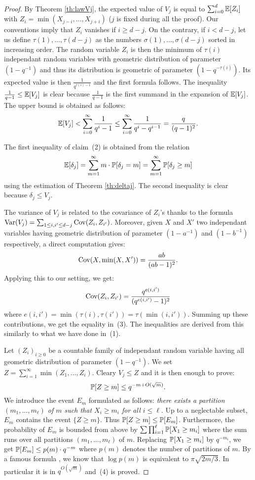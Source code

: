 \documentclass{article}
\begin{document}
\begin{proof}
By Theorem \ref{th:lawVj}, the expected value of $V_j$ is equal to 
$\sum_{i=0}^d \E[Z_i]$ with $Z_i = \min(X_{j-i}, \ldots, X_{j+i})$ ($j$ 
is fixed during all the proof). Our conventions imply that $Z_i$ 
vanishes if $i \geq d-j$. On the contrary, if $i < d-j$, let us define 
$\tau(1), \ldots, \tau(d-j)$ as the numbers $\sigma(1), \ldots, 
\sigma(d-j)$ sorted in increasing order. The random variable $Z_i$ 
is then the minimum of $\tau(i)$ independant random variables with 
geometric distribution of parameter $(1 - q^{-1})$ and thus its 
distribution is geometric of parameter $(1 - q^{-\tau(i)})$.
Its expected value is then $\frac 1 {q^{\tau(i) - 1}}$ and the first
formula follows. The inequality $\frac 1 {q-1} \leq \E[V_j]$ is clear
because $\frac 1 {q-1}$ is the first summand in the expansion of
$\E[V_j]$. The upper bound is obtained as follows:
$$\E[V_j] < \sum_{i=0}^\infty \frac 1{q^i - 1}
\leq \sum_{i=0}^\infty \frac 1{q^i - q^{i-1}} = \frac q {(q-1)^2}.$$

The first inequality of claim~(2) is obtained from the relation 
$$\E[\delta_j] 
= \sum_{m=1}^\infty m \cdot \P[\delta_j = m]
= \sum_{m=1}^\infty \P[\delta_j \geq m]$$ 
using the estimation of Theorem \ref{th:deltaj}. The second inequality 
is clear because $\delta_j \leq V_j$.

The variance of $V_j$ is related to the covariance of $Z_i$'s thanks to 
the formula
$\Var(V_j) = \sum_{1 \leq i,i' \leq d-j} \Cov(Z_i, Z_{i'})$.
Moreover, given $X$ and $X'$ two independant variables having geometric
distribution of parameter $(1 - a^{-1})$ and $(1 - b^{-1})$ respectively,
a direct computation gives:
$$\Cov(X, \min(X,X')) = \frac{ab}{(ab-1)^2}.$$
Applying this to our setting, we get:
$$\Cov(Z_i, Z_{i'}) = \frac{q^{e(i,i')}}{(q^{e(i,i')}-1)^2}$$
where $e(i,i') = \min(\tau(i), \tau(i')) = \tau(\min(i,i'))$. Summing
up these contributions, we get the equality in~(3). The inequalities
are derived from this similarly to what we have done in~(1).

Let $(Z_i)_{i \geq 0}$ be a countable family 
of independant random variable having all geometric distribution of 
parameter $(1 - q^{-1})$. We set $Z = \sum_{i=1}^\infty \min(Z_1, \ldots, 
Z_i)$. Cleary $V_j \leq Z$ and it is then enough to prove:
$$\P[Z \geq m] \leq q^{-m + O(\sqrt m)}.$$
We introduce the event $E_m$ formulated as follows:
\emph{there exists a partition $(m_1, \ldots, m_\ell)$ of $m$ such that $X_i 
\geq m_i$ for all $i \leq \ell$}.
Up to a neglectable subset, $E_m$ contains the event $\{ Z \geq m\}$.
Thus $\P[Z \geq m] \leq \P[E_m]$. Furthermore, the probability of $E_m$
is bounded from above by $\sum \prod_{i=1}^\ell \P[X_1 \geq m_i]$ where
the sum runs over all partitions $(m_1, \ldots, m_\ell)$ of $m$. 
Replacing $\P[X_1 \geq m_i]$ by $q^{-m_i}$, we get
$\P[E_m] \leq p(m) \cdot q^{-m}$
where $p(m)$ denotes the number of partitions of $m$. By a famous 
formula \cite{andrews}, we know that $\log p(m)$ is equivalent to $\pi 
\sqrt{2m/3}$. In particular it is in $q^{O(\sqrt m)}$ and~(4) is proved.


\end{proof}
\end{document}
